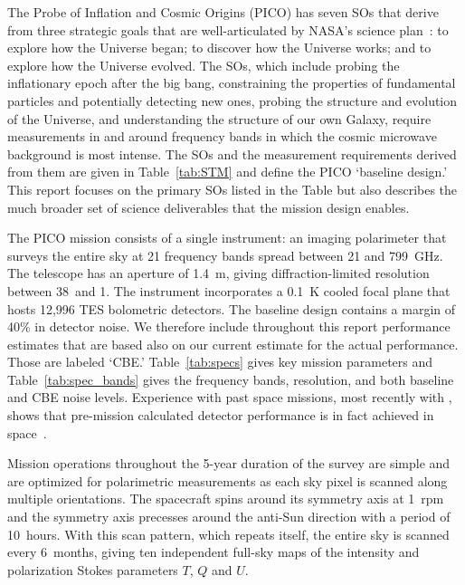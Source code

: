 \documentclass[PICOReport.tex]{subfiles}
\begin{document}
 
 
The Probe of Inflation and Cosmic Origins (PICO) has seven \ac{SOs} that derive from three strategic goals that are well-articulated by NASA's science plan~\citep{latest_nasa_science_plan,latest_nasa_strategic_plan}: to explore how the Universe began; to discover how the Universe works; and to explore how the Universe evolved. The \ac{SOs}, which include probing the inflationary epoch after the big bang, constraining the properties of fundamental particles and potentially detecting new ones, probing the structure and evolution of the Universe, and understanding the structure of our own Galaxy, require measurements in and around frequency bands in which the cosmic microwave background is most intense. The \ac{SOs} and the measurement requirements derived from them are given in Table~\ref{tab:STM} and define the PICO `baseline design.' 
This report focuses on the primary \ac{SOs} listed in the Table but also describes the much broader set of science deliverables that the mission design enables.

The PICO mission consists of a single instrument: an imaging polarimeter that surveys the entire sky at 21 frequency bands spread between 21 and 799~GHz.  The telescope has an aperture of 1.4~m, giving diffraction-limited resolution between 38\arcmin\ and 1\arcmin . The instrument incorporates a 0.1~K cooled focal plane that hosts 12,996 \ac{TES} bolometric detectors. The baseline design contains a margin of 40\% in detector noise. We therefore include throughout this report performance estimates that are based also on our current estimate for the actual performance. Those are labeled `\ac{CBE}.' Table~\ref{tab:specs} gives key mission parameters and Table~\ref{tab:spec_bands} gives the frequency bands, resolution, and both baseline and \ac{CBE} noise levels. Experience with past space missions, most recently with \planck , shows that pre-mission calculated detector performance is in fact achieved in space~\citep{planck1101.2038,planck1101.2039,Jarosik}.

Mission operations throughout the 5-year duration of the survey are simple and are optimized for polarimetric measurements as each sky pixel is scanned along multiple orientations. The spacecraft spins around its symmetry axis at 1~rpm and the symmetry axis precesses around the anti-Sun direction with a period of 10~hours. With this scan pattern, which repeats itself, the entire sky is scanned every 6~months, giving ten independent full-sky maps of the intensity and polarization Stokes parameters $T$, $Q$ and $U$.  
\end{document}
